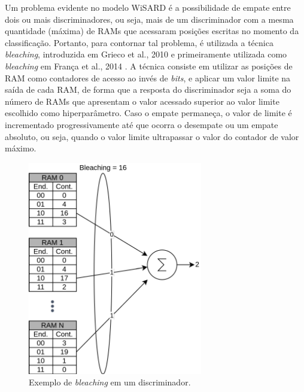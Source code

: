 Um problema evidente no modelo WiSARD é a possibilidade de empate entre dois ou mais discriminadores, ou seja, mais de um discriminador com a mesma quantidade (máxima) de RAMs que acessaram posições escritas no momento da classificação. Portanto, para contornar tal problema, é utilizada a técnica \textit{bleaching}, introduzida em Grieco et al., 2010 \cite{mentalimages} e primeiramente utilizada como \textit{bleaching} em França et al., 2014 \cite{advanceswns}. A técnica consiste em utilizar as posições de RAM como contadores de acesso ao invés de \textit{bits}, e aplicar um valor limite na saída de cada RAM, de forma que a resposta do discriminador seja a soma do número de RAMs que apresentam o valor acessado superior ao valor limite escolhido como hiperparâmetro. Caso o empate permaneça, o valor de limite é incrementado progressivamente até que ocorra o desempate ou um empate absoluto, ou seja, quando o valor limite ultrapassar o valor do contador de valor máximo.

\begin{figure}[!ht]
    \centering
    \includegraphics[width=3.0in]{img/bleaching.pdf}
    \caption{Exemplo de \textit{bleaching} em um discriminador.}
    \label{fig:bleaching}
\end{figure}

